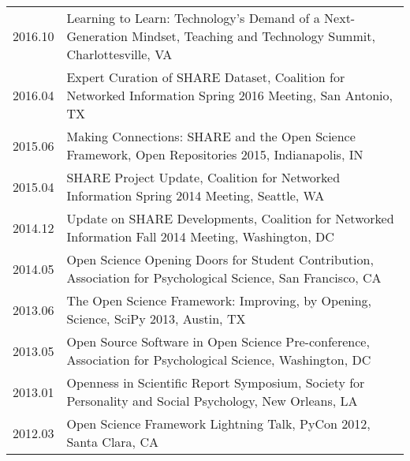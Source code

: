 \documentclass[11pt]{article}
\begin{document}
\begin{tabularx}{\textwidth}{lX}
    2016.10    & Learning to Learn: Technology's Demand of a Next-Generation Mindset, Teaching and Technology Summit, Charlottesville, VA\\
    2016.04    & Expert Curation of SHARE Dataset, Coalition for Networked Information Spring 2016 Meeting, San Antonio, TX\\
    2015.06    & Making Connections: SHARE and the Open Science Framework, Open Repositories 2015, Indianapolis, IN\\
    2015.04    & SHARE Project Update, Coalition for Networked Information Spring 2014 Meeting, Seattle, WA\\
    2014.12    & Update on SHARE Developments, Coalition for Networked Information Fall 2014 Meeting, Washington, DC\\
    2014.05    & Open Science Opening Doors for Student Contribution, Association for Psychological Science, San Francisco, CA\\
    2013.06    & The Open Science Framework: Improving, by Opening, Science, SciPy 2013, Austin, TX\\
    2013.05    & Open Source Software in Open Science Pre-conference, Association for Psychological Science, Washington, DC\\
    2013.01    & Openness in Scientific Report Symposium, Society for Personality and Social Psychology, New Orleans, LA\\
    2012.03    & Open Science Framework Lightning Talk, PyCon 2012, Santa Clara, CA\\
\end{tabularx}
\end{document}

